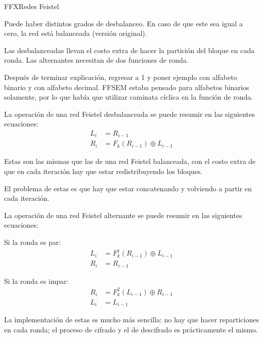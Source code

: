 \begin{frame}{FFX}{Redes Feistel}
  {
    Puede haber distintos grados de desbalanceo. En caso de que este sea igual
    a cero, la red está balanceada (versión original).

    Las desbalanceadas llevan el costo extra de hacer la partición del bloque
    en cada ronda. Las alternantes necesitan de dos funciones de ronda.

    Después de terminar explicación, regresar a 1 y poner ejemplo con
    alfabeto binario y con alfabeto decimal. FFSEM estaba pensado para
    alfabetos binarios solamente, por lo que había que utilizar caminata
    cíclica en la función de ronda.
  }

  {
    La operación de una red Feistel desbalanceada se puede resumir en las
    siguientes ecuaciones:
    \begin{align*}
      L_{i} &= R_{i - 1} \\
      R_{i} &= F_k(R_{i - 1}) \oplus L_{i - 1}
    \end{align*}

    Estas son las mismas que las de una red Feistel balanceada, con el costo
    extra de que en cada iteración hay que estar redistribuyendo los bloques.
  }

  {
    El problema de estas es que hay que estar concatenando y volviendo a partir
    en cada iteración.
  }

  {
    La operación de una red Feistel alternante se puede resumir en las
    siguientes ecuaciones:

    Si la ronda es par:
    \begin{align*}
      L_{i} &= F^1_k(R_{i - 1}) \oplus L_{i - 1} \\
      R_{i} &= R_{i - 1}
    \end{align*}

    Si la ronda es impar:
    \begin{align*}
      R_{i} &= F^2_k(L_{i - 1}) \oplus R_{i - 1} \\
      L_{i} &= L_{i - 1}
    \end{align*}
  }

  {
    La implementación de estas es mucho más sencilla: no hay que hacer
    reparticiones en cada ronda; el proceso de cifrado y el de descifrado es
    prácticamente el mismo.
  }

\end{frame}

